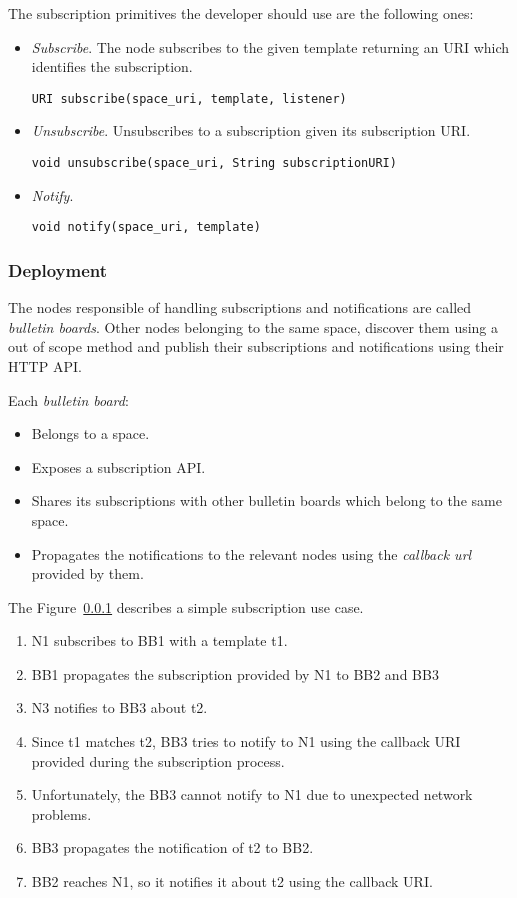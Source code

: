 The subscription primitives the developer should use are the following ones:
\begin{itemize}
  \item \emph{Subscribe}. The node subscribes to the given template returning an URI which identifies the subscription.
    \begin{verbatim}
URI subscribe(space_uri, template, listener)
    \end{verbatim}
  \item \emph{Unsubscribe}. Unsubscribes to a subscription given its subscription URI.
    \begin{verbatim}
void unsubscribe(space_uri, String subscriptionURI)
    \end{verbatim}
  \item \emph{Notify}.
    \begin{verbatim}
void notify(space_uri, template)
    \end{verbatim}
\end{itemize}


\subsubsection{Deployment}

The nodes responsible of handling subscriptions and notifications are called \emph{bulletin boards}.
Other nodes belonging to the same space, discover them using a out of scope method and publish their subscriptions and notifications using their HTTP API.

Each \emph{bulletin board}:
\begin{itemize}
  \item Belongs to a space.
  \item Exposes a subscription API.
  \item Shares its subscriptions with other bulletin boards which belong to the same space.
  \item Propagates the notifications to the relevant nodes using the \emph{callback url} provided by them.
\end{itemize}


The Figure~\ref{} describes a simple subscription use case.
\begin{enumerate}
  \item N1 subscribes to BB1 with a template t1.
  \item BB1 propagates the subscription provided by N1 to BB2 and BB3
  \item N3 notifies to BB3 about t2.
  \item Since t1 matches t2, BB3 tries to notify to N1 using the callback URI provided during the subscription process.
  \item Unfortunately, the BB3 cannot notify to N1 due to unexpected network problems.
  \item BB3 propagates the notification of t2 to BB2.
  \item BB2 reaches N1, so it notifies it about t2 using the callback URI.
\end{enumerate}


